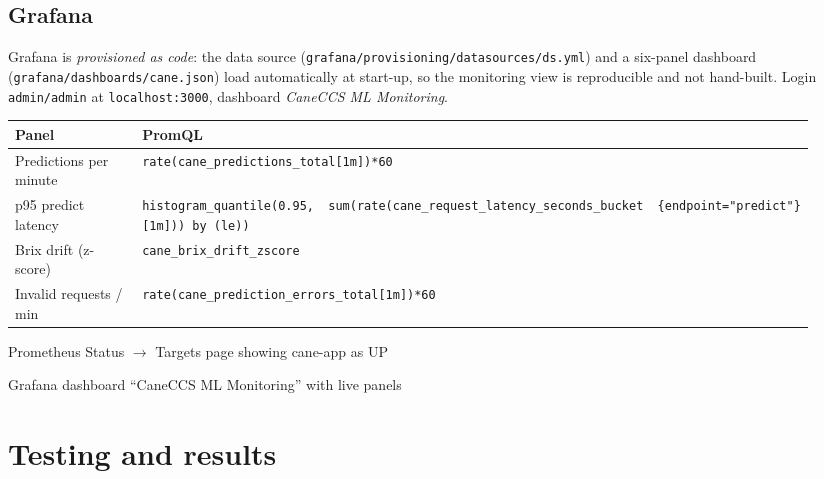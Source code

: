 \documentclass[10pt,a4paper]{article}
\let\oldsection\section
\renewcommand{\section}{\Needspace{14\baselineskip}\oldsection}
\begin{document}

\vspace{-2pt}


\subsection*{Grafana}
Grafana is \emph{provisioned as code}: the data source (\texttt{grafana/provisioning/datasources/ds.yml}) and a six-panel dashboard
(\texttt{grafana/dashboards/cane.json}) load automatically at start-up, so the monitoring view is reproducible and not hand-built.
Login \texttt{admin/admin} at \texttt{localhost:3000}, dashboard \emph{CaneCCS ML Monitoring}.

\begin{center}\small
\begin{tabular}{@{}p{0.25\linewidth}p{0.68\linewidth}@{}}
\toprule
\textbf{Panel} & \textbf{PromQL}\\
\midrule
Predictions per minute & \texttt{rate(cane\_predictions\_total[1m])*60}\\
p95 predict latency & \texttt{histogram\_quantile(0.95,}\newline \texttt{\ \ sum(rate(cane\_request\_latency\_seconds\_bucket}\newline \texttt{\ \ \{endpoint="predict"\}[1m])) by (le))}\\
Brix drift (z-score) & \texttt{cane\_brix\_drift\_zscore}\\
Invalid requests / min & \texttt{rate(cane\_prediction\_errors\_total[1m])*60}\\
\bottomrule
\end{tabular}
\end{center}

\begin{shot}{Prometheus Status $\rightarrow$ Targets page showing cane-app as UP}\end{shot}
\vspace{4pt}
\begin{shot}{Grafana dashboard ``CaneCCS ML Monitoring'' with live panels}\end{shot}

\section{Testing and results}
\end{document}
